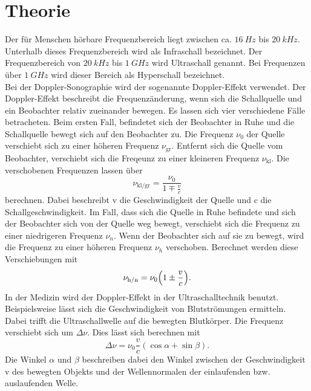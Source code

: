 \section{Theorie}
\label{sec:Theorie}
Der für Menschen hörbare Frequenzbereich liegt zwischen ca. $\qty{16}{Hz}$ bis $\qty{20}{kHz}$.
Unterhalb dieses Frequenzbereich wird als Infraschall bezeichnet.
Der Frequenzbereich von $\qty{20}{kHz}$ bis $\qty{1}{GHz}$ wird Ultraschall genannt.
Bei Frequenzen über $\qty{1}{GHz}$ wird dieser Bereich als Hyperschall bezeichnet.\\


\noindent Bei der Doppler-Sonographie wird der sogenannte Doppler-Effekt verwendet.
Der Doppler-Effekt beschreibt die Frequenzänderung, wenn sich die Schallquelle und ein Beobachter relativ zueinander bewegen.
Es lassen sich vier verschiedene Fälle betracheten.
Beim ersten Fall, befindetet sich der Beobachter in Ruhe und die Schallquelle bewegt sich auf den Beobachter zu.
Die Frequenz $\nu_0$ der Quelle verschiebt sich zu einer höheren Frequenz $\nu_\text{gr}$.
Entfernt sich die Quelle vom Beobachter, verschiebt sich die Freqeunz zu einer kleineren Frequenz $\nu_\text{kl}$.
Die verschobenen Frequenzen lassen über 
\begin{equation}
    \label{eq:vklgr}
    \nu_\text{kl/gr} = \frac{\nu_0}{1 \mp \frac{v}{c}}
\end{equation}
berechnen.
Dabei beschreibt v die Geschwindigkeit der Quelle und c die Schallgeschwindigkeit.
Im Fall, dass sich die Quelle in Ruhe befindete und sich der Beobachter sich von der Quelle weg bewegt, verschiebt sich die Frequenz zu einer niedrigeren
Frequenz $\nu_n$.
Wenn der Beobachter sich auf sie zu bewegt, wird die Frequenz zu einer höheren Frequenz $\nu_h$ verschoben.
Berechnet werden diese Verschiebungen mit 
\begin{equation}
    \label{eq:vhn}
    \nu_\text{h/n} = \nu_0 \Bigl(1 \pm \frac{v}{c}\Bigr).
\end{equation}
In der Medizin wird der Doppler-Effekt in der Ultraschalltechnik benutzt.
Beispielsweise lässt sich die Geschwindigkeit von Blutströmungen ermitteln.
Dabei trifft die Ultraschallwelle auf die bewegten Blutkörper.
Die Frequenz verschiebt sich um $\Delta \nu$.
Dies lässt sich berechnen mit 
\begin{equation}
    \label{eq:deltav}
    \Delta \nu = \nu_0 \frac{v}{c}(\cos \alpha + \sin \beta).
\end{equation}
Die Winkel $\alpha$ und $\beta$ beschreiben dabei den Winkel zwischen der Geschwindigkeit v des bewegten Objekts und der Wellennormalen der einlaufenden bzw. auslaufenden Welle.
